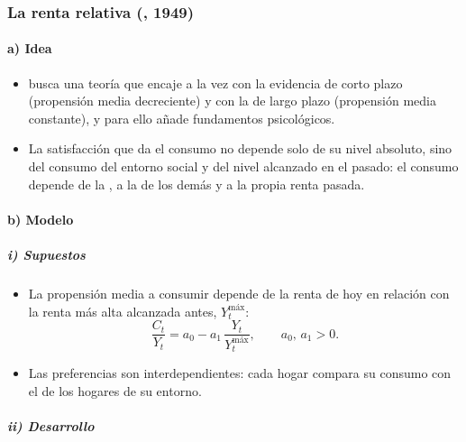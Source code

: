 \documentclass[11pt]{article}
\begin{document}
\subsubsection{La renta relativa (, 1949)}\label{sec:duesenberry}

\paragraph{a) Idea}

\begin{itemize}
\item \textcite{Duesenberry1949Income} busca una teoría que encaje a la vez con la evidencia de corto plazo (propensión media decreciente) y con la de largo plazo (propensión media constante), y para ello añade fundamentos psicológicos.
\item La satisfacción que da el consumo no depende solo de su nivel absoluto, sino del consumo del entorno social y del nivel alcanzado en el pasado: el consumo depende de la , a la de los demás y a la propia renta pasada.
\end{itemize}

\paragraph{b) Modelo}

\subparagraph{i) Supuestos}

\begin{itemize}
\item La propensión media a consumir depende de la renta de hoy en relación con la renta más alta alcanzada antes, $Y^{\text{máx}}_t$:
  \begin{equation}
  \frac{C_t}{Y_t}=a_0-a_1\,\frac{Y_t}{Y^{\text{máx}}_t},\qquad a_0,\,a_1>0.\label{eq:duesenberry}
  \end{equation}
\item Las preferencias son interdependientes: cada hogar compara su consumo con el de los hogares de su entorno.
\end{itemize}

\subparagraph{ii) Desarrollo}
\end{document}
